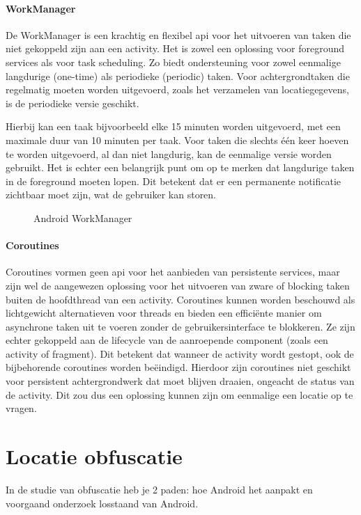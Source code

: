 \paragraph{WorkManager}\cite{android_persistent}
De WorkManager is een krachtig en flexibel \gls{api} voor het uitvoeren van taken die niet gekoppeld zijn aan een activity. 
Het is zowel een oplossing voor foreground services als voor task scheduling. 
Zo biedt ondersteuning voor zowel eenmalige langdurige (one-time) als periodieke (periodic) taken. Voor achtergrondtaken die regelmatig moeten worden uitgevoerd, zoals het verzamelen van locatiegegevens, is de periodieke versie geschikt. 

Hierbij kan een taak bijvoorbeeld elke 15 minuten worden uitgevoerd, met een maximale duur van 10 minuten per taak. 
Voor taken die slechts één keer hoeven te worden uitgevoerd, al dan niet langdurig, kan de eenmalige versie worden gebruikt. Het is echter een belangrijk punt om op te merken dat langdurige taken in de foreground moeten lopen. Dit betekent dat er een permanente notificatie zichtbaar moet zijn, wat de gebruiker kan storen.

\begin{figure}[h]
    \centering
    
    \caption{Android WorkManager}
    \label{fig:workmanager}
\end{figure}
\paragraph{Coroutines}\cite{kotlin_coroutines}
Coroutines vormen geen \gls{api} voor het aanbieden van persistente services, maar zijn wel de aangewezen oplossing voor het uitvoeren van zware of blocking taken buiten de hoofdthread van een activity. Coroutines kunnen worden beschouwd als lichtgewicht alternatieven voor threads en bieden een efficiënte manier om asynchrone taken uit te voeren zonder de gebruikersinterface te blokkeren. Ze zijn echter gekoppeld aan de lifecycle van de aanroepende component (zoals een activity of fragment). Dit betekent dat wanneer de activity wordt gestopt, ook de bijbehorende coroutines worden beëindigd. Hierdoor zijn coroutines niet geschikt voor persistent achtergrondwerk dat moet blijven draaien, ongeacht de status van de activity.
Dit zou dus een oplossing kunnen zijn om eenmalige een locatie op te vragen.
\section{Locatie obfuscatie}
In de studie van obfuscatie heb je 2 paden: hoe Android het aanpakt en voorgaand onderzoek losstaand van Android.
